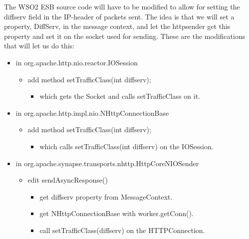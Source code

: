     The WSO2 ESB source code will have to be modified to allow for setting the diffserv field in the IP-header of packets sent. The idea is that we will set a property, DiffServ, in the message context, and let the httpsender get this property and set it on the socket used for sending. These are the modifications that will let us do this:
    \begin{itemize}
        \item in org.apache.http.nio.reactor.IOSession
        \begin{itemize}
            \item add method setTrafficClass(int diffserv);
            \begin{itemize}
                \item which gets the Socket and calls setTrafficClass on it.
            \end{itemize}
        \end{itemize}
        \item in org.apache.http.impl.nio.NHttpConnectionBase
        \begin{itemize}
            \item add method setTrafficClass(int diffserv);
            \begin{itemize}
                \item which calls setTrafficClass(int diffserv) on the IOSession.
            \end{itemize}
        \end{itemize}
        \item in org.apache.synapse.transports.nhttp.HttpCoreNIOSender
        \begin{itemize}
            \item edit sendAsyncResponse()
            \begin{itemize}
                \item get diffserv property from MessageContext.
                \item get NHttpConnectionBase with worker.getConn().
                \item call setTrafficClass(diffserv) on the HTTPConnection. 
            \end{itemize}
        \end{itemize}
    \end{itemize}
    
    
